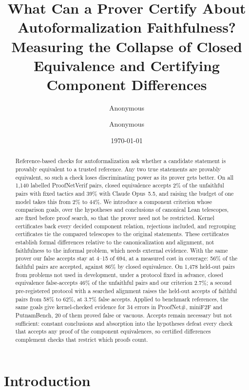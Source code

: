 \documentclass[10pt]{article}
\title{What Can a Prover Certify About Autoformalization Faithfulness?\\
Measuring the Collapse of Closed Equivalence and Certifying Component Differences}
\author{Anonymous}
\date{}
\author{Anonymous}
\date{\today}
\theoremstyle{definition}
\begin{document}
\maketitle

\begin{abstract}
Reference-based checks for autoformalization ask whether a candidate statement is provably
equivalent to a trusted reference. Any two true statements are provably equivalent, so such a
check loses discriminating power as its prover gets better. On all 1,140 labelled ProofNetVerif
pairs, closed equivalence accepts 2\% of the unfaithful pairs with fixed tactics and 39\% with
Claude Opus~5.5, and raising the budget of one model takes this from 2\% to 44\%. We introduce a
component criterion whose comparison goals, over the hypotheses and conclusions of canonical
Lean telescopes, are fixed before proof search, so that the prover need not be restricted.
Kernel certificates back every decided component relation, rejections included, and
regrouping certificates tie the compared telescopes to the original statements. These
certificates establish formal differences relative to the canonicalization and alignment, not
faithfulness to the informal problem, which needs external evidence. With the same prover our false accepts stay at 4--15 of 694, at a measured
cost in coverage: 56\% of the faithful pairs are accepted, against 86\% by closed equivalence. On
1,478 held-out pairs from problems not used in development, under a protocol fixed in advance,
closed equivalence false-accepts 46\% of the unfaithful pairs and our criterion 2.7\%; a second
pre-registered protocol with a searched alignment raises the held-out accepts of faithful pairs
from 58\% to 62\%, at 3.7\% false accepts. Applied to benchmark references, the same goals give
kernel-checked evidence for 34 errors in ProofNet\#, miniF2F and PutnamBench, 20 of them proved
false or vacuous. Accepts remain necessary but not sufficient: constant conclusions and absorption
into the hypotheses defeat every check that accepts any proof of the component equivalences, so
certified differences complement checks that restrict which proofs count.
\end{abstract}

\section{Introduction}\label{sec:intro}
\end{document}
